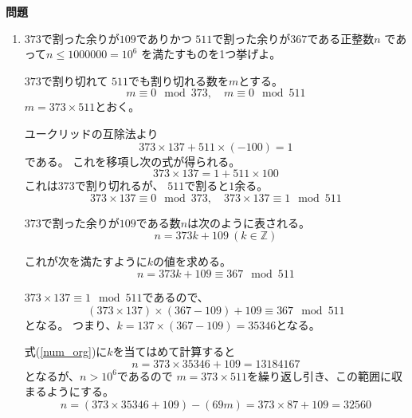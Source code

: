 \documentclass[12pt,b5paper]{ltjsarticle}
\begin{document}
\hrulefill
\textbf{問題}
\hrulefill


\begin{enumerate}
 \item
      $373$で割った余りが$109$でありかつ
      $511$で割った余りが$367$である正整数$n$
      であって$n\leq 1 000 000 = 10^{6}$
      を満たすものを1つ挙げよ。

      \dotfill

      $373$で割り切れて
      $511$でも割り切れる数を$m$とする。
      \begin{equation}
       m \equiv 0 \mod{373}, \quad
       m \equiv 0 \mod{511}
      \end{equation}
      $m=373\times 511$とおく。

      ユークリッドの互除法より
      \begin{equation}
       373 \times 137 + 511 \times (-100) =1
      \end{equation}
      である。
      これを移項し次の式が得られる。
      \begin{equation}
       373 \times 137 = 1 + 511 \times 100
      \end{equation}
      これは$373$で割り切れるが、
      $511$で割ると$1$余る。
      \begin{equation}
       373 \times 137 \equiv 0 \mod{373},\quad
        373 \times 137 %
        \equiv 1 \mod{511}
      \end{equation}



      $373$で割った余りが$109$である数$n$は次のように表される。
      \begin{equation}
       n = 373k + 109 \ (k\in\mathbb{Z})
        \label{num_org}
      \end{equation}

      これが次を満たすように$k$の値を求める。
      \begin{equation}
       n = 373k + 109 \equiv 367 \mod{511}
      \end{equation}

      $373 \times 137 \equiv 1 \mod{511}$であるので、
      \begin{equation}
       (373 \times 137)\times (367-109) + 109 \equiv 367 \mod{511}
      \end{equation}
      となる。
      つまり、$k=137\times (367-109) = 35346$となる。

      式(\ref{num_org})に$k$を当てはめて計算すると
      \begin{equation}
       n = 373 \times 35346 + 109 = 13 184 167
      \end{equation}
      となるが、$n>10^6$であるので
      $m=373\times 511$を繰り返し引き、この範囲に収まるようにする。
      \begin{equation}
       n = (373 \times 35346 + 109 ) - (69m)
        = 373 \times 87 + 109
        = 32560
      \end{equation}


\end{enumerate}
\end{document}
